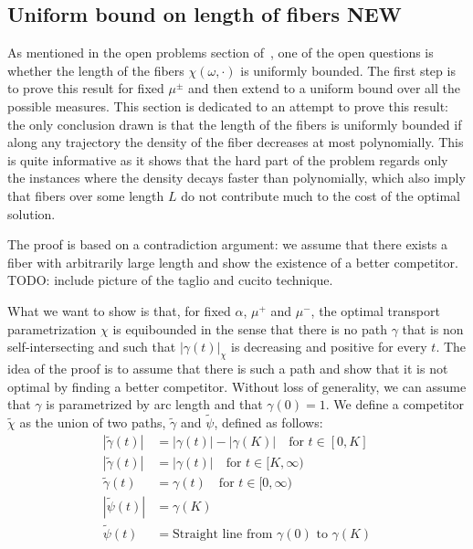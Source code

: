 \documentclass[12pt,a4paper]{article}
\numberwithin{equation}{section}
\theoremstyle{mytheorem}
\theoremstyle{myremark}
\theoremstyle{myparagraph}
\begin{document}
    \subsection{Uniform bound on length of fibers NEW}

    As mentioned in the open problems section of~\cite[Chapter 15, question 13]{Bernot}, one of the open questions is whether the length of the fibers
    $\chi(\omega, \cdot)$ is uniformly bounded. The first step is to prove this result for fixed $\mu^\pm$ and then extend to a uniform bound over all the possible measures.
    This section is dedicated to an attempt to prove this result: the only conclusion drawn is that the length of the fibers is uniformly bounded if along any 
    trajectory the density of the fiber decreases at most polynomially. This is quite informative as it shows that the hard part of the problem regards only the instances
    where the density decays faster than polynomially, which also imply that fibers over some length $L$ do not contribute much to the cost of the optimal solution.

    The proof is based on a contradiction argument: we assume that there exists a fiber with arbitrarily large length and show the existence of a better competitor.
    TODO: include picture of the taglio and cucito technique.

    What we want to show is that, for fixed $\alpha$, $\mu^+$ and $\mu^-$, the optimal transport parametrization $\chi$
    is equibounded in the sense that there is no path $\gamma$ that is non self-intersecting and such that $|\gamma(t)|_\chi$ is decreasing and positive
    for every $t$.
    The idea of the proof is to assume that there is such a path and show that it is not optimal by finding a better competitor.
    Without loss of generality, we can assume that $\gamma$ is parametrized by arc length and that $\gamma(0) = 1$.
    We define a competitor $\tilde\chi$ as the union of two paths, $\tilde{\gamma}$ and $\tilde{\psi}$, defined as follows:
    \begin{align*}
        |\tilde{\gamma}(t)| &= |\gamma(t)| - |\gamma(K)| \quad \text{for } t \in [0, K] \\
        |\tilde{\gamma}(t)| &= |\gamma(t)| \quad \text{for } t \in [K, \infty) \\
        \tilde{\gamma}(t) &= \gamma(t) \quad \text{for } t \in [0, \infty) \\
        |\tilde{\psi}(t)| &= \gamma(K) \\
        \tilde{\psi}(t) &= \text{Straight line from } \gamma(0) \text{ to } \gamma(K)
    \end{align*}
\end{document}
